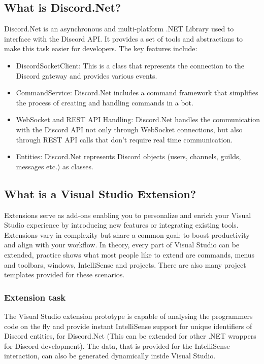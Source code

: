 \subsection{What is Discord.Net?}
Discord.Net is an asynchronous and multi-platform .NET Library used to interface with the Discord API. It provides a set of tools and abstractions to make this task easier for developers. The key features include:
\begin{itemize}
	\item DiscordSocketClient: This is a class that represents the connection to the Discord gateway and provides various events.
	\item CommandService: Discord.Net includes a command framework that simplifies the process of creating and handling commands in a bot.
	\item WebSocket and REST API Handling: Discord.Net handles the communication with the Discord API not only through WebSocket connections, but also through REST API calls that don't require real time communication.
	\item Entities: Discord.Net represents Discord objects (users, channels, guilds, messages etc.) as classes. \cite{discorddotnet}
\end{itemize}

\subsection{What is a Visual Studio Extension?}
Extensions serve as add-ons enabling you to personalize and enrich your Visual Studio experience by introducing new features or integrating existing tools. Extensions vary in complexity but share a common goal: to boost productivity and align with your workflow. In theory, every part of Visual Studio can be extended, practice shows what most people like to extend are commands, menus and toolbars, windows, IntelliSense and projects. There are also many project templates provided for these scenarios. \cite{whatisvsextension}

\subsubsection{Extension task}
The Visual Studio extension prototype is capable of analysing the programmers code on the fly and provide instant IntelliSense support for unique identifiers of Discord entities, for Discord.Net (This can be extended for other .NET wrappers for Discord development). The data, that is provided for the IntelliSense interaction, can also be generated dynamically inside Visual Studio.


